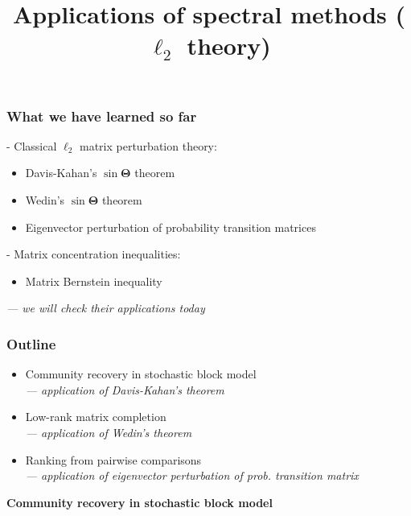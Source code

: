 \documentclass[compress,
mathserif,wide,%
]{beamer}
\title %
{Applications of spectral methods ($\ell_{2}$ theory)}
\begin{document}
\begin{frame}[plain]
  \titlepage

\end{frame}

\begin{frame}
	\frametitle{What we have learned so far}
	
	- Classical $\ell_{2}$ matrix perturbation theory: 
	\begin{itemize}
		\item Davis-Kahan's $\sin \bm{\Theta}$ theorem 				\item Wedin's $\sin \bm{\Theta}$ theorem 		
		\item Eigenvector perturbation of probability transition matrices
	\end{itemize}
	
	\vfill 
	- Matrix concentration inequalities:
	\begin{itemize}
		\item Matrix Bernstein inequality
	\end{itemize}
	
	\vfill
	\pause
	{\hfill \em --- we will check their applications today}
\end{frame}

\begin{frame}
\frametitle{Outline}

\begin{itemize}
  \itemsep1em
  \item Community recovery in stochastic block model \\
  	{\footnotesize \hfill \em --- application of Davis-Kahan's theorem}
  \item Low-rank matrix completion \\
  	{\footnotesize \hfill \em --- application of Wedin's theorem}
  \item Ranking from pairwise comparisons \\
  	{\footnotesize \hfill \em --- application of eigenvector perturbation of prob. transition matrix}
\end{itemize}

\end{frame}


\begin{frame}[plain]
	\vfill
	\centering
	\large \bf Community recovery in stochastic block model
	\vfill
\end{frame}
\end{document}
